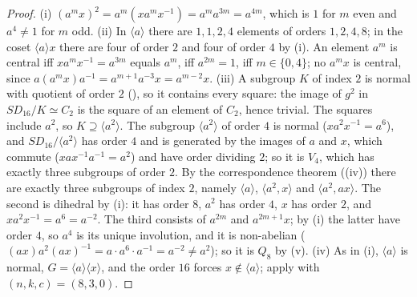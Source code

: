\begin{proof}
(i) $(a^mx)^2=a^m(xa^mx^{-1})=a^ma^{3m}=a^{4m}$, which is $1$ for $m$ even and $a^4\ne1$ for $m$ odd. (ii) In $\langle a\rangle$ there are $1,1,2,4$
elements of orders $1,2,4,8$; in the coset $\langle a\rangle x$ there are four of order $2$ and four of order $4$ by (i). An element $a^m$ is central iff
$xa^mx^{-1}=a^{3m}$ equals $a^m$, iff $a^{2m}=1$, iff $m\in\{0,4\}$; no $a^mx$ is central, since $a(a^mx)a^{-1}=a^{m+1}a^{-3}x=a^{m-2}x$.
(iii) A subgroup $K$ of index $2$ is normal with quotient of order $2$ (), so it contains every square: the image of $g^2$
in $SD_{16}/K\simeq C_2$ is the square of an element of $C_2$, hence trivial. The squares include $a^2$, so
$K\supseteq\langle a^2\rangle$. The subgroup $\langle a^2\rangle$ of order $4$ is normal ($xa^2x^{-1}=a^6$), and $SD_{16}/\langle a^2\rangle$ has order $4$ and is generated
by the images of $a$ and $x$, which commute ($xax^{-1}a^{-1}=a^2$) and have order dividing $2$; so it is $V_4$, which has exactly three subgroups of
order $2$. By the correspondence theorem ((iv)) there are exactly three subgroups of index $2$, namely $\langle a\rangle$,
$\langle a^2,x\rangle$ and $\langle a^2,ax\rangle$. The second is dihedral by (i): it has order $8$, $a^2$ has order $4$, $x$ has order $2$, and
$xa^2x^{-1}=a^6=a^{-2}$. The third consists of $a^{2m}$ and $a^{2m+1}x$; by (i) the latter have order $4$, so $a^4$ is its unique involution, and it is
non-abelian ($(ax)a^2(ax)^{-1}=a\cdot a^6\cdot a^{-1}=a^{-2}\ne a^2$); so it is $Q_8$ by (v). (iv) As in
(i), $\langle a\rangle$ is normal, $G=\langle a\rangle\langle x\rangle$, and the order $16$ forces $x\notin\langle a\rangle$; apply
 with $(n,k,c)=(8,3,0)$.
\end{proof}

